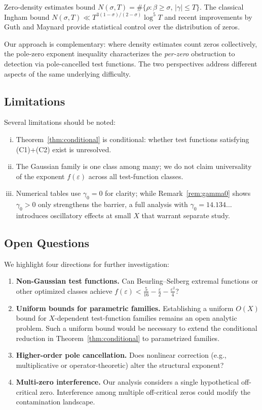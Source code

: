 \documentclass[12pt]{article}
\theoremstyle{remark}
\begin{document}
Zero-density estimates bound $N(\sigma, T) = \#\{\rho : \beta \geq \sigma,\,
|\gamma| \leq T\}$. The classical Ingham bound $N(\sigma,T) \ll
T^{3(1-\sigma)/(2-\sigma)} \log^5 T$ and recent improvements by Guth and
Maynard \cite{GuthMaynard2024} provide statistical control over the
distribution of zeros.

Our approach is complementary: where density estimates count zeros
collectively, the pole-zero exponent inequality characterizes the
\emph{per-zero} obstruction to detection via pole-cancelled test functions.
The two perspectives address different aspects of the same underlying
difficulty.

\subsection{Limitations}

Several limitations should be noted:
\begin{enumerate}[(i)]
\item Theorem~\ref{thm:conditional} is conditional: whether test functions
  satisfying (C1)+(C2) exist is unresolved.
\item The Gaussian family is one class among many; we do not claim
  universality of the exponent $f(\varepsilon)$ across all test-function
  classes.
\item Numerical tables use $\gamma_0 = 0$ for clarity; while
  Remark~\ref{rem:gamma0} shows $\gamma_0 > 0$ only strengthens the
  barrier, a full analysis with $\gamma_0 = 14.134\ldots$ introduces
  oscillatory effects at small $X$ that warrant separate study.
\end{enumerate}

\subsection{Open Questions}

We highlight four directions for further investigation:

\begin{enumerate}[(1)]
\item \textbf{Non-Gaussian test functions.}
  Can Beurling--Selberg extremal functions or other optimized classes
  achieve $f(\varepsilon) < \tfrac{5}{16} - \tfrac{\varepsilon}{2}
  - \tfrac{\varepsilon^2}{4}$?

\item \textbf{Uniform bounds for parametric families.}
  Establishing a uniform $O(X)$ bound for $X$-dependent test-function
  families remains an open analytic problem. Such a uniform bound would
  be necessary to extend the conditional reduction in
  Theorem~\ref{thm:conditional} to parametrized families.

\item \textbf{Higher-order pole cancellation.}
  Does nonlinear correction (e.g., multiplicative or operator-theoretic)
  alter the structural exponent?

\item \textbf{Multi-zero interference.}
  Our analysis considers a single hypothetical off-critical zero.
  Interference among multiple off-critical zeros could modify the
  contamination landscape.
\end{enumerate}
\end{document}

